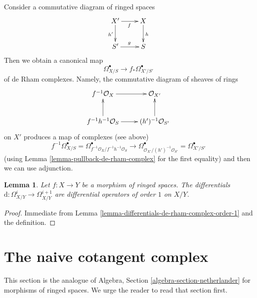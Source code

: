 \documentclass{stacks-project}
\theoremstyle{plain}
\newtheorem{lemma}[subsection]{Lemma}
\theoremstyle{definition}
\theoremstyle{remark}
\numberwithin{equation}{subsection}
\begin{document}
\noindent
Consider a commutative diagram of ringed spaces
$$
\xymatrix{
X' \ar[d]_{h'} \ar[r]_f & X \ar[d]^h \\
S' \ar[r]^g & S
}
$$
Then we obtain a canonical map
$$
\Omega^\bullet_{X/S} \to f_*\Omega^\bullet_{X'/S'}
$$
of de Rham complexes. Namely, the commutative diagram
of sheaves of rings
$$
\xymatrix{
f^{-1}\mathcal{O}_X \ar[r] & \mathcal{O}_{X'} \\
f^{-1}h^{-1}\mathcal{O}_S \ar[u] \ar[r] & (h')^{-1}\mathcal{O}_{S'} \ar[u]
}
$$
on $X'$ produces a map of complexes (see above)
$$
f^{-1}\Omega^\bullet_{X/S} =
\Omega^\bullet_{f^{-1}\mathcal{O}_X/f^{-1}h^{-1}\mathcal{O}_S}
\longrightarrow
\Omega^\bullet_{\mathcal{O}_{X'}/(h')^{-1}\mathcal{O}_{S'}} =
\Omega^\bullet_{X'/S'}
$$
(using Lemma \ref{lemma-pullback-de-rham-complex} for the first equality)
and then we can use adjunction.

\begin{lemma}
\label{lemma-differentials-relative-de-rham-complex-order-1}
Let $f : X \to Y$ be a morphism of ringed spaces. The differentials
$\text{d} : \Omega^i_{X/Y}  \to \Omega^{i + 1}_{X/Y}$
are differential operators of order $1$ on $X/Y$.
\end{lemma}

\begin{proof}
Immediate from Lemma \ref{lemma-differentials-de-rham-complex-order-1}
and the definition.
\end{proof}





















\section{The naive cotangent complex}
\label{section-netherlander}

\noindent
This section is the analogue of
Algebra, Section \ref{algebra-section-netherlander} for morphisms of ringed
spaces. We urge the reader to read that section first.
\end{document}
